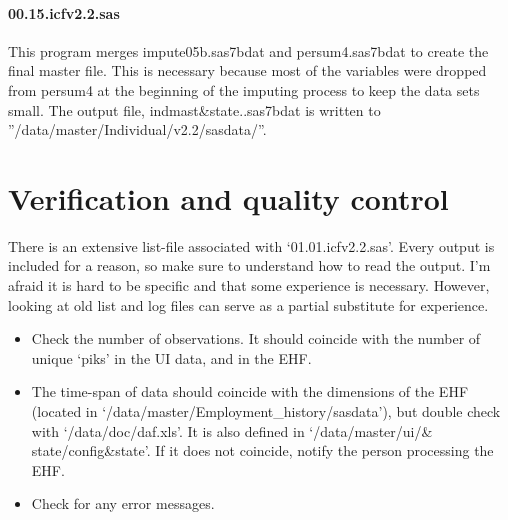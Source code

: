 \paragraph{00.15.icfv2.2.sas}

This program merges impute05b.sas7bdat and persum4.sas7bdat to create the
final master file. This is necessary because most of the variables were
dropped from persum4 at the beginning of the imputing process to keep the
data sets small. The output file, indmast{\&}state..sas7bdat is written to
''/data/master/Individual/v2.2/sasdata/''.


\section{Verification and quality control\label{icf_tech:what1}}

There is an extensive list-file associated with `01.01.icfv2.2.sas'. Every
output is included for a reason, so make sure to understand how to read the
output. I'm afraid it is hard to be specific and that some experience is
necessary. However, looking at old list and log files can serve as a partial
substitute for experience.

\begin{itemize}
\item Check the number of observations. It should coincide with the number
of unique `piks' in the UI data, and in the EHF.

\item The time-span of data should coincide with the dimensions of the EHF
(located in `/data/master/Employment{\_}history/sasdata'), but double check
with `/data/doc/daf.xls'. It is also defined in `/data/master/ui/{\&}%
state/config{\&}state'. If it does not coincide, notify the person
processing the EHF.

\item Check for any error messages.
\end{itemize}



